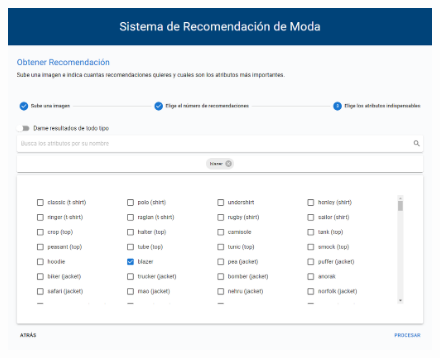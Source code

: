 \documentclass[12pt]{report} %
\begin{document}
\begin{itemize}
\begin{figure}[H]
			{\includegraphics[scale=0.3]{pantalla-3.png}}
		\end{figure}
		

\end{itemize}
\end{document}
